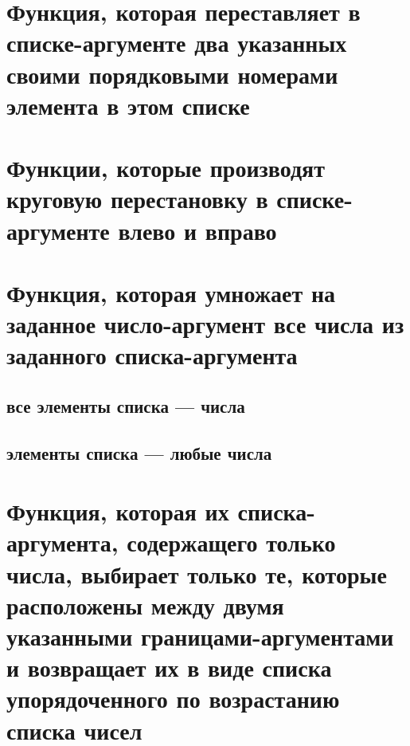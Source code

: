 


\section{Функция, которая переставляет в списке-аргументе два указанных своими порядковыми номерами элемента в этом списке}




\section{Функции, которые производят круговую перестановку в списке-аргументе влево и вправо}



\section{Функция, которая умножает на заданное число-аргумент все числа из заданного списка-аргумента}


\subsection{все элементы списка --- числа}


\subsection{элементы списка --- любые числа}



\section{Функция, которая их списка-аргумента, содержащего только числа, выбирает только те, которые расположены между двумя указанными гра\-ни\-ца\-ми-аргументами и возвращает их в виде списка упорядоченного по возрастанию списка чисел}